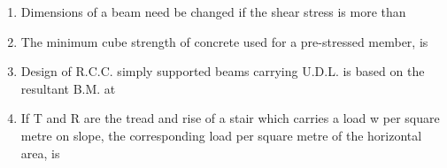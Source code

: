 \documentclass[11pt,a4paper]{article}
\begin{document}
\begin{enumerate}
{}
\\\begin{enumerate*}[itemjoin=\qquad, label=\Alph*.]
\item{12 cm}
\item{6 cm}
\item{8 cm}
\item{10 cm}
\end{enumerate*}
\item{Dimensions of a beam need be changed if the shear stress is more than}
\\
\item{The minimum cube strength of concrete used for a pre-stressed member, is}
\\
\item{Design of R.C.C. simply supported beams carrying U.D.L. is based on the resultant B.M. at}
\\
\item{If T and R are the tread and rise of a stair which carries a load w per square metre on slope, the corresponding load per square metre of the horizontal area, is}
\\
\end{enumerate}
\end{document}
